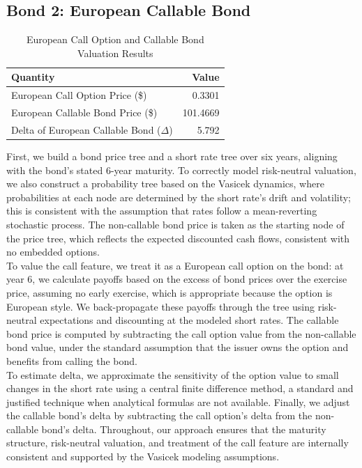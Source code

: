 \documentclass{article}
\begin{document}
\subsection{Bond 2: European Callable Bond}

\begin{table}[ht]
\centering
\begin{tabular}{l r}
\hline
Quantity & Value \\
\hline
European Call Option Price (\$) & 0.3301 \\
European Callable Bond Price (\$) & 101.4669 \\
Delta of European Callable Bond ($ \Delta  $) & 5.792 \\
\hline
\end{tabular}
\caption{European Call Option and Callable Bond Valuation Results}
\end{table}


First, we build a bond price tree and a short rate tree over six years, aligning with the bond’s stated 6-year maturity. To correctly model risk-neutral valuation, we also construct a probability tree based on the Vasicek dynamics, where probabilities at each node are determined by the short rate’s drift and volatility; this is consistent with the assumption that rates follow a mean-reverting stochastic process. The non-callable bond price is taken as the starting node of the price tree, which reflects the expected discounted cash flows, consistent with no embedded options. \\

To value the call feature, we treat it as a European call option on the bond: at year 6, we calculate payoffs based on the excess of bond prices over the exercise price, assuming no early exercise, which is appropriate because the option is European style. We back-propagate these payoffs through the tree using risk-neutral expectations and discounting at the modeled short rates. The callable bond price is computed by subtracting the call option value from the non-callable bond value, under the standard assumption that the issuer owns the option and benefits from calling the bond. \\

To estimate delta, we approximate the sensitivity of the option value to small changes in the short rate using a central finite difference method, a standard and justified technique when analytical formulas are not available. Finally, we adjust the callable bond’s delta by subtracting the call option's delta from the non-callable bond's delta. Throughout, our approach ensures that the maturity structure, risk-neutral valuation, and treatment of the call feature are internally consistent and supported by the Vasicek modeling assumptions.
\end{document}
